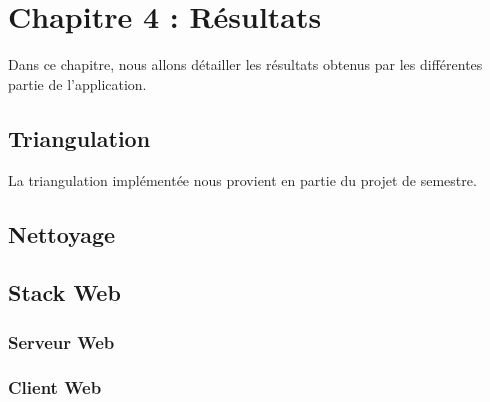 
\chapter{Chapitre 4 : Résultats}
Dans ce chapitre, nous allons détailler les résultats obtenus par les
différentes partie de l'application.
\section{Triangulation}

La triangulation implémentée nous provient en partie du projet de semestre.

\section{Nettoyage}
\section{Stack Web}
\subsection{Serveur Web}
\subsection{Client Web}
